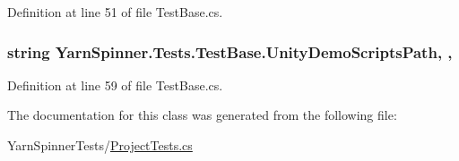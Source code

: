 Definition at line 51 of file Test\-Base.\-cs.

\hypertarget{a00154_a39922286f6255e4fd0e433a4fc7521c4}{
\subsubsection[{Unity\-Demo\-Scripts\-Path}]{\setlength{\rightskip}{0pt plus 5cm}string Yarn\-Spinner.\-Tests.\-Test\-Base.\-Unity\-Demo\-Scripts\-Path\hspace{0.3cm}{\ttfamily [static]}, {\ttfamily [get]}, {\ttfamily [inherited]}}}\label{a00154_a39922286f6255e4fd0e433a4fc7521c4}


Definition at line 59 of file Test\-Base.\-cs.



The documentation for this class was generated from the following file\-:\begin{DoxyCompactItemize}
\item 
Yarn\-Spinner\-Tests/\hyperlink{a00307}{Project\-Tests.\-cs}\end{DoxyCompactItemize}
